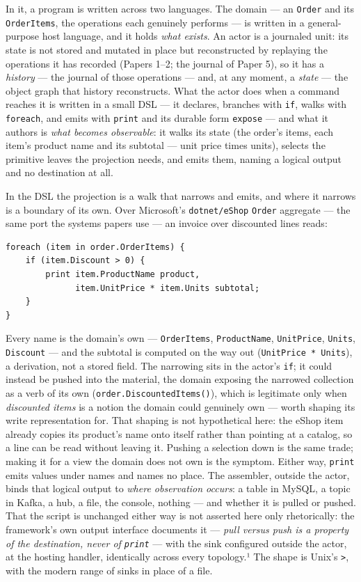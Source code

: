 \documentclass[
]{article}
\begin{document}
In it, a program is written across two languages. The domain --- an
\texttt{Order} and its \texttt{OrderItems}, the operations each
genuinely performs --- is written in a general-purpose host language,
and it holds \emph{what exists}. An actor is a journaled unit: its state
is not stored and mutated in place but reconstructed by replaying the
operations it has recorded (Papers 1--2; the journal of Paper 5), so it
has a \emph{history} --- the journal of those operations --- and, at any
moment, a \emph{state} --- the object graph that history reconstructs.
What the actor does when a command reaches it is written in a small DSL
--- it declares, branches with \texttt{if}, walks with \texttt{foreach},
and emits with \texttt{print} and its durable form \texttt{expose} ---
and what it authors is \emph{what becomes observable}: it walks its
state (the order's items, each item's product name and its subtotal ---
unit price times units), selects the primitive leaves the projection
needs, and emits them, naming a logical output and no destination at
all.

In the DSL the projection is a walk that narrows and emits, and where it
narrows is a boundary of its own. Over Microsoft's \texttt{dotnet/eShop}
\texttt{Order} aggregate --- the same port the systems papers use --- an
invoice over discounted lines reads:

\begin{verbatim}
foreach (item in order.OrderItems) {
    if (item.Discount > 0) {
        print item.ProductName product,
              item.UnitPrice * item.Units subtotal;
    }
}
\end{verbatim}

Every name is the domain's own --- \texttt{OrderItems},
\texttt{ProductName}, \texttt{UnitPrice}, \texttt{Units},
\texttt{Discount} --- and the subtotal is computed on the way out
(\texttt{UnitPrice\ *\ Units}), a derivation, not a stored field. The
narrowing sits in the actor's \texttt{if}; it could instead be pushed
into the material, the domain exposing the narrowed collection as a verb
of its own (\texttt{order.DiscountedItems()}), which is legitimate only
when \emph{discounted items} is a notion the domain could genuinely own
--- worth shaping its write representation for. That shaping is not
hypothetical here: the eShop item already copies its product's name onto
itself rather than pointing at a catalog, so a line can be read without
leaving it. Pushing a selection down is the same trade; making it for a
view the domain does not own is the symptom. Either way, \texttt{print}
emits values under names and names no place. The assembler, outside the
actor, binds that logical output to \emph{where observation occurs}: a
table in MySQL, a topic in Kafka, a hub, a file, the console, nothing
--- and whether it is pulled or pushed. That the script is unchanged
either way is not asserted here only rhetorically: the framework's own
output interface documents it --- \emph{pull versus push is a property
of the destination, never of \texttt{print}} --- with the sink
configured outside the actor, at the hosting handler, identically across
every topology.¹ The shape is Unix's \texttt{\textgreater{}}, with the
modern range of sinks in place of a file.
\end{document}
